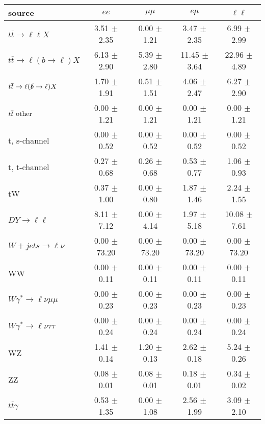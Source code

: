 \begin{tabular}{l|cccc} \hline\hline
source & $ee$ & $\mu\mu$ & $e\mu$ & $\ell\ell $ \\
\hline
$t\overline{t} \rightarrow \ell \ell X$ &  3.51 $\pm$  2.35 &  0.00 $\pm$  1.21 &  3.47 $\pm$  2.35 &  6.99 $\pm$  2.99 \\
$t\overline{t} \rightarrow \ell (b \rightarrow \ell) X$ &  6.13 $\pm$  2.90 &  5.39 $\pm$  2.80 & 11.45 $\pm$  3.64 & 22.96 $\pm$  4.89 \\
$t\overline{t} \rightarrow \ell (\slashed b \rightarrow \ell) X$ &  1.70 $\pm$  1.91 &  0.51 $\pm$  1.51 &  4.06 $\pm$  2.47 &  6.27 $\pm$  2.90 \\
        $t\overline{t}\ \rm{other}$ &  0.00 $\pm$  1.21 &  0.00 $\pm$  1.21 &  0.00 $\pm$  1.21 &  0.00 $\pm$  1.21 \\
\hline
                       t, s-channel &  0.00 $\pm$  0.52 &  0.00 $\pm$  0.52 &  0.00 $\pm$  0.52 &  0.00 $\pm$  0.52 \\
                       t, t-channel &  0.27 $\pm$  0.68 &  0.26 $\pm$  0.68 &  0.53 $\pm$  0.77 &  1.06 $\pm$  0.93 \\
                                 tW &  0.37 $\pm$  1.00 &  0.00 $\pm$  0.80 &  1.87 $\pm$  1.46 &  2.24 $\pm$  1.55 \\
\hline
         $DY \rightarrow \ell \ell$ &  8.11 $\pm$  7.12 &  0.00 $\pm$  4.14 &  1.97 $\pm$  5.18 & 10.08 $\pm$  7.61 \\
      $W+jets \rightarrow \ell \nu$ &  0.00 $\pm$ 73.20 &  0.00 $\pm$ 73.20 &  0.00 $\pm$ 73.20 &  0.00 $\pm$ 73.20 \\
                                 WW &  0.00 $\pm$  0.11 &  0.00 $\pm$  0.11 &  0.00 $\pm$  0.11 &  0.00 $\pm$  0.11 \\
\hline
$W\gamma^{*} \rightarrow \ell \nu \mu\mu$ &  0.00 $\pm$  0.23 &  0.00 $\pm$  0.23 &  0.00 $\pm$  0.23 &  0.00 $\pm$  0.23 \\
$W\gamma^{*} \rightarrow \ell \nu \tau\tau$ &  0.00 $\pm$  0.24 &  0.00 $\pm$  0.24 &  0.00 $\pm$  0.24 &  0.00 $\pm$  0.24 \\
                                 WZ &  1.41 $\pm$  0.14 &  1.20 $\pm$  0.13 &  2.62 $\pm$  0.18 &  5.24 $\pm$  0.26 \\
                                 ZZ &  0.08 $\pm$  0.01 &  0.08 $\pm$  0.01 &  0.18 $\pm$  0.01 &  0.34 $\pm$  0.02 \\
\hline
              $t\overline{t}\gamma$ &  0.53 $\pm$  1.35 &  0.00 $\pm$  1.08 &  2.56 $\pm$  1.99 &  3.09 $\pm$  2.10 \\

\end{tabular}
